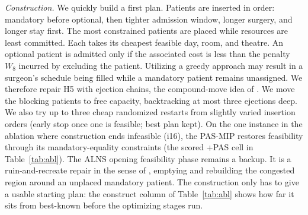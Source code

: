 \documentclass[11pt]{article}
\newcommand{\Hc}[1]{\textsf{H#1}}
\begin{document}
	\emph{Construction.} We quickly build a first plan. Patients are inserted in order: mandatory before optional, then tighter admission window, longer surgery, and longer stay first. The most constrained patients are placed while resources are least committed. Each takes its cheapest feasible day, room, and theatre. An optional patient is admitted only if the associated cost
	is less than the penalty $W_8$ incurred by excluding the patient. Utilizing a greedy approach may result in a surgeon’s schedule being filled while a mandatory patient remains unassigned. We therefore repair \Hc5 with ejection chains, the compound-move idea of \citet{glover1996}. We move the blocking patients to free capacity, backtracking at most three ejections deep. We also try up to three cheap randomized restarts from slightly varied insertion orders (early stop once one is feasible; best plan kept). On the one instance in the ablation where construction ends infeasible (i16), the PAS-MIP restores feasibility through its mandatory-equality constraints (the scored +PAS cell in Table~\ref{tab:abl}). The ALNS opening feasibility phase remains a backup. It is a ruin-and-recreate repair in the sense of \citet{schrimpf2000}, emptying and rebuilding the congested region around an unplaced mandatory patient. The construction only has to give a usable starting plan: the construct column of Table~\ref{tab:abl} shows how far it sits from best-known before the optimizing stages run.
	
\end{document}
